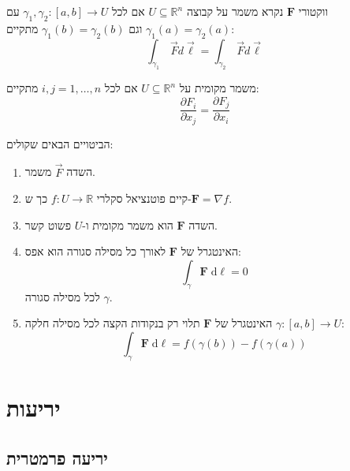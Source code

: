\documentclass{tstextbook}
\begin{document}
\begin{definition}
ווקטורי \(\mathbf{F}\) נקרא משמר על קבוצה \(U\subseteq \mathbb{R}^{n}\) אם לכל \(\gamma_{1},\gamma_{2}:[a,b]\to U\) עם \(\gamma_{1}(a)=\gamma_{2}(a)\) וגם \(\gamma_{1}(b)=\gamma_{2}(b)\) מתקיים:
$$\int_{\gamma_{1}}\,\vec{F}d\vec{\ell}=\int_{\gamma_{2}}\,\vec{F}d\vec{\ell}$$

\end{definition}
\begin{definition}
משמר מקומית על \(U\subseteq \mathbb{R}^{n}\) אם לכל \(i,j = 1,\dots,n\) מתקיים:
$$\frac{\partial F_{i}}{\partial x_{j}} =\frac{\partial F_{j}}{\partial x_{i}}$$

\end{definition}
\begin{proposition}
הביטויים הבאים שקולים:

  \begin{enumerate}
    \item השדה \(\vec{F}\) משמר. 


    \item קיים פוטנציאל סקלרי \(f:U\to\mathbb{R}\) כך ש-\(\mathbf{F} = \nabla f\). 


    \item השדה \(\mathbf{F}\) הוא משמר מקומית ו-\(U\) פשוט קשר. 


    \item האינטגרל של \(\mathbf{F}\) לאורך כל מסילה סגורה הוא אפס: 
$$\int_{\gamma}\mathbf{F} \;\mathrm{d}\boldsymbol{\ell} = 0$$
לכל מסילה סגורה \(\gamma\).


    \item האינטגרל של \(\mathbf{F}\) תלוי רק בנקודות הקצה לכל מסילה חלקה \(\gamma:[a,b]\to U\): 
$$\int_{\gamma}\mathbf{F} \;\mathrm{d}\boldsymbol{\ell} = f(\gamma(b)) - f(\gamma(a))$$


  \end{enumerate}
\end{proposition}
\chapter{יריעות}

\section{יריעה פרמטרית}
\end{document}
